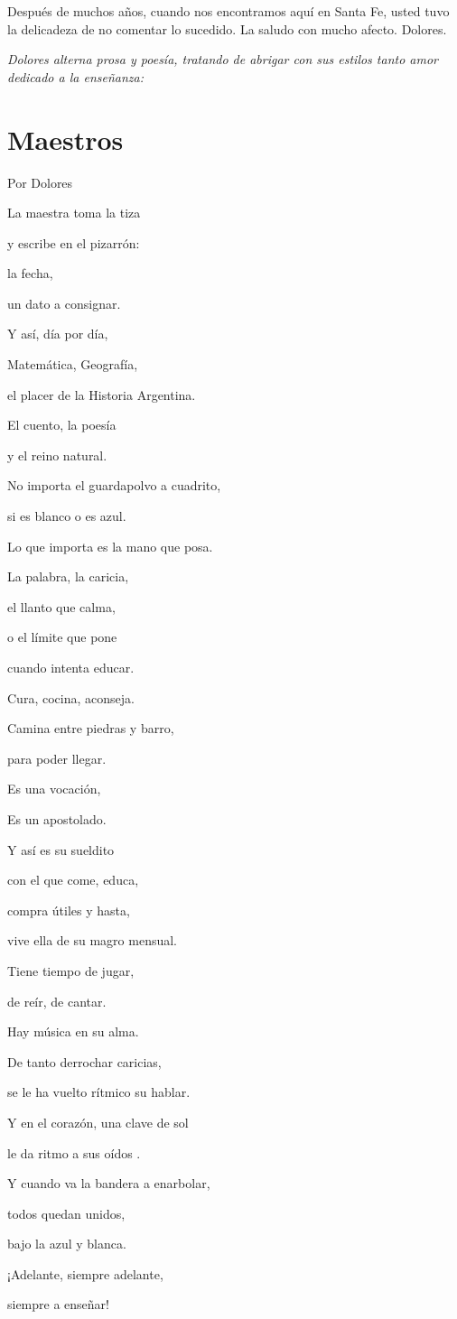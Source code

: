 \documentclass[11pt,twoside,openright,a5paper]{book}
\begin{document}
Después de muchos años, cuando nos encontramos aquí en Santa Fe, usted tuvo la delicadeza de no comentar lo sucedido. La saludo con mucho afecto. Dolores.

\vspace{0.5cm}
\emph{Dolores alterna prosa y poesía, tratando de abrigar con sus estilos tanto amor dedicado a la enseñanza:}


\section*{Maestros}

\begin{flushright}Por Dolores\end{flushright}

\begin{center}
La maestra toma la tiza

y escribe en el pizarrón:

la fecha,

un dato a consignar.

Y así, día por día, 

Matemática, Geografía,

el placer de la Historia Argentina.

El cuento, la poesía

y el reino natural.

No importa el guardapolvo a cuadrito,

si es blanco o es azul.

Lo que importa es la mano que posa.

La palabra, la caricia,

el llanto que calma,

o el límite que pone

cuando intenta educar.

Cura, cocina, aconseja.

Camina entre piedras y barro,

para poder llegar.

Es una vocación,

Es un apostolado.

Y así es su sueldito

con el que come, educa,

compra útiles y hasta,

vive ella de su magro mensual.

Tiene tiempo de jugar, 

de reír, de cantar.

Hay música en su alma.

De tanto derrochar caricias,

se le ha vuelto rítmico su hablar.

Y en el corazón, una clave de sol

le da ritmo a sus oídos .

Y cuando va la bandera a enarbolar,

todos quedan unidos,

bajo la azul y blanca.

¡Adelante, siempre adelante,

siempre a enseñar!
\end{center}
\end{document}
